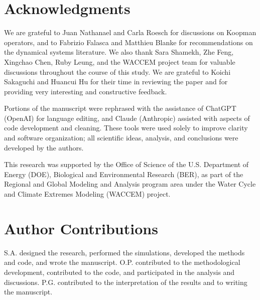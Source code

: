 \documentclass[11pt]{article}
\begin{document}
\section{Acknowledgments}

We are grateful to Juan Nathanael and Carla Roesch for discussions on Koopman operators, and to Fabrizio Falasca and Matthieu Blanke for recommendations on the dynamical systems literature. We also thank Sara Shamekh, Zhe Feng, Xingchao Chen, Ruby Leung, and the WACCEM project team for valuable discussions throughout the course of this study. We are grateful to Koichi Sakaguchi and Huancui Hu for their time in reviewing the paper and for providing very interesting and constructive feedback.

Portions of the manuscript were rephrased with the assistance of ChatGPT (OpenAI) for language editing, and Claude (Anthropic) assisted with aspects of code development and cleaning. These tools were used solely to improve clarity and software organization; all scientific ideas, analysis, and conclusions were developed by the authors.


This research was supported by the Office of Science of the U.S. Department of Energy (DOE), Biological and Environmental Research (BER), as part of the Regional and Global Modeling and Analysis program area under the Water Cycle and Climate Extremes Modeling (WACCEM) project.

\section{Author Contributions}

S.A. designed the research, performed the simulations, developed the methods and code, and wrote the manuscript. O.P. contributed to the methodological development, contributed to the code, and participated in the analysis and discussions. P.G. contributed to the interpretation of the results and to writing the manuscript.


\printbibliography
\end{document}
